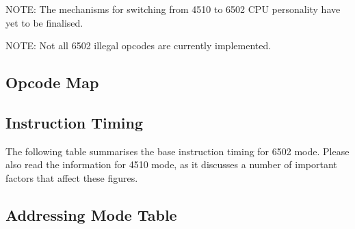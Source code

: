 NOTE: The mechanisms for switching from 4510 to 6502 CPU personality
have yet to be finalised.

NOTE: Not all 6502 illegal opcodes are currently implemented.

\subsection{Opcode Map}

\begin{center}
\end{center}

\subsection{Instruction Timing}

The following table summarises the base instruction timing for 6502 mode.
Please also read the information for 4510 mode, as it discusses a number
of important factors that affect these figures.

\begin{center}
\end{center}

\subsection{Addressing Mode Table}

\begin{center}
\end{center}





